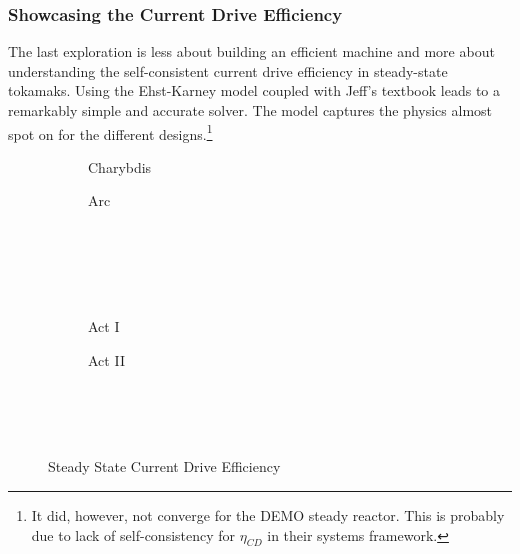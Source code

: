 \subsubsection{Showcasing the Current Drive Efficiency}

The last exploration is less about building an efficient machine and more about understanding the self-consistent current drive efficiency in steady-state tokamaks. Using the Ehst-Karney model \cite{ehstkarney} coupled with Jeff's textbook \cite{jeff} leads to a remarkably simple and accurate solver. The model captures the physics almost spot on for the different designs.\footnote{ It did, however, not converge for the DEMO steady reactor. This is probably due to lack of self-consistency for $\eta_{CD}$ in their systems framework. }

\begin{figure*}
    \centering
    \hfill 
    \begin{subfigure}[t]{0.45\textwidth}
        \centering
		\begin{adjustbox}{width=\textwidth}
			\Large
			
		\end{adjustbox}
        \caption{Charybdis}
    \end{subfigure}
    \hfill
    \begin{subfigure}[t]{0.45\textwidth}
        \centering
		\begin{adjustbox}{width=\textwidth}
			\Large
			
		\end{adjustbox}
        \caption{Arc}
    \end{subfigure}
    \hfill \hfill ~\\ ~\\ ~\\ ~\\
    \hfill 
    \begin{subfigure}[t]{0.45\textwidth}
        \centering
		\begin{adjustbox}{width=\textwidth}
			\Large
			
		\end{adjustbox}
        \caption{Act I}
    \end{subfigure}
    \hfill
    \begin{subfigure}[t]{0.45\textwidth}
        \centering
		\begin{adjustbox}{width=\textwidth}
			\Large
			
		\end{adjustbox}
        \caption{Act II}
    \end{subfigure}
    \hfill \hfill ~\\ ~\\ ~\\
    \caption{Steady State Current Drive Efficiency}
    \label{fig:steady_eta_CD}
\end{figure*}

